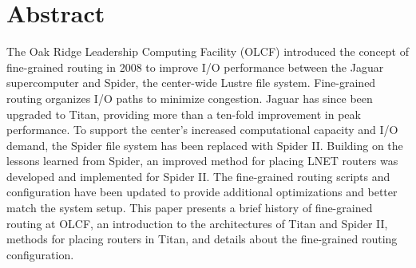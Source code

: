 \section{Abstract}

The Oak Ridge Leadership Computing Facility (OLCF) introduced the concept of
fine-grained routing in 2008 to improve I/O performance between the Jaguar
supercomputer and Spider, the center-wide Lustre file system. Fine-grained
routing organizes I/O paths to minimize congestion. Jaguar has since been
upgraded to Titan, providing more than a ten-fold improvement in peak
performance. To support the center’s increased computational capacity and I/O
demand, the Spider file system has been replaced with Spider II. Building on
the lessons learned from Spider, an improved method for placing LNET routers
was developed and implemented for Spider II. The fine-grained routing scripts
and configuration have been updated to provide additional optimizations and
better match the system setup. This paper presents a brief history of
fine-grained routing at OLCF, an introduction to the architectures of Titan and
Spider II, methods for placing routers in Titan, and details about the
fine-grained routing configuration.

